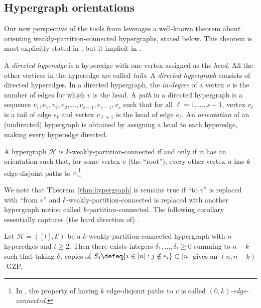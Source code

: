 \documentclass{article}[11pt]
\begin{document}
\subsection{Hypergraph orientations}
Our new perspective of the tools from \cite{BGM23} leverages a well-known theorem about orienting weakly-partition-connected hypergraphs, stated below. This theorem is most explicitly stated in \cite{Frank11}, but it implicit in \cite{Kiraly03,FKK03b}.

  A \emph{directed hyperedge} is a hyperedge with one vertex assigned as the \emph{head}. All the other vertices in the hyperedge are called \emph{tails}. 
  A \emph{directed hypergraph} consists of directed hyperedges.
  In a directed hypergraph, the \emph{in-degree} of a vertex $v$ is the number of edges for which $v$ is the head.
  A \emph{path} in a directed hypergraph is a sequence $v_1,e_1,v_2,e_2,\dots,v_{s-1},e_{s-1},v_s$ such that for all $\ell=1,\dots,s-1$, vertex $v_\ell$ is a tail of edge $e_\ell$ and vertex $v_{\ell+1}$ is the head of edge $e_\ell$.
  An \emph{orientation} of an (undirected) hypergraph is obtained by assigning a head to each hyperedge, making every hyperedge directed.
  \begin{theorem}
    A hypergraph $\mathcal{H}$ is $k$-weakly-partition-connected if and only if it has an orientation such that, for some vertex $v$ (the ``root''), every other vertex $u$ has $k$ edge-disjoint paths to $v$.\footnote{In \cite[Theorems 9.4.13 and 15.4.4]{Frank11}, the property of having $k$ edge-disjoint paths to $v$ is called \emph{$(0,k)$-edge-connected}.}
  \label{thm:hypergraph}
  \end{theorem}
  We note that Theorem~\ref{thm:hypergraph} is remains true if ``to $v$'' is replaced with ``from $v$'' and $k$-weakly-partition-connected is replaced with another hypergraph notion called $k$-partition-connected.
  The following corollary essentially captures (the hard direction of) \cite[Lemma~2.8]{BGM23}.
  \begin{corollary}
    Let $\mathcal{H}=([t],\mathcal{E})$ be a $k$-weakly-partition-connected hypergraph with $n$ hyperedges and $t \ge 2$. Then there exists integers $\delta_1,\dots,\delta_t\ge 0$ summing to $n-k$ such that taking $\delta_j$ copies of $S_j\defeq \{i \in [n]: j\notin e_i\}\subset[n]$ gives an $(n,n-k)$-GZP.
    \label{cor:hypergraph}
  \end{corollary}
\end{document}
